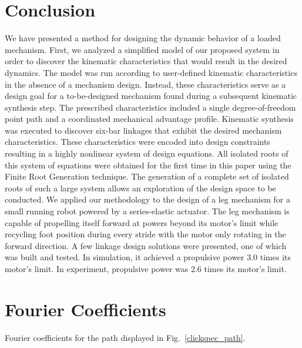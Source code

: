 \documentclass[journal]{IEEEtran}
\begin{document}
\section{Conclusion}
\label{sec:conclusion}

We have presented a method for designing the dynamic behavior of a loaded mechanism.
First, we analyzed a simplified model of our proposed system in order to discover the kinematic characteristics that would result in the desired dynamics.
The model was run according to user-defined kinematic characteristics in the absence of a mechanism design.
Instead, these characteristics serve as a design goal for a to\nobreakdash-be\nobreakdash-designed mechanism found during a subsequent kinematic synthesis step.
The prescribed characteristics included a single degree\nobreakdash-of\nobreakdash-freedom point path and a coordinated mechanical advantage profile.
Kinematic synthesis was executed to discover six-bar linkages that exhibit the desired mechanism characteristics.
These characteristics were encoded into design constraints resulting in a highly nonlinear system of design equations.
All isolated roots of this system of equations were obtained for the first time in this paper using the Finite Root Generation technique.
The generation of a complete set of isolated roots of such a large system allows an exploration of the design space to be conducted.
We applied our methodology to the design of a leg mechanism for a small running robot powered by a series-elastic actuator.
The leg mechanism is capable of propelling itself forward at powers beyond its motor's limit while recycling foot position during every stride with the motor only rotating in the forward direction.
A few linkage design solutions were presented, one of which was built and tested.
In simulation, it achieved a propulsive power 3.0 times its motor's limit.  In experiment, propulsive power was 2.6 times its motor's limit.



\appendices
\section{Fourier Coefficients}
\label{app:fourier_coefficients}

\vspace{2mm}

Fourier coefficients for the path displayed in Fig.~\ref{clickspec_path}.

\vspace{2mm}
\end{document}
